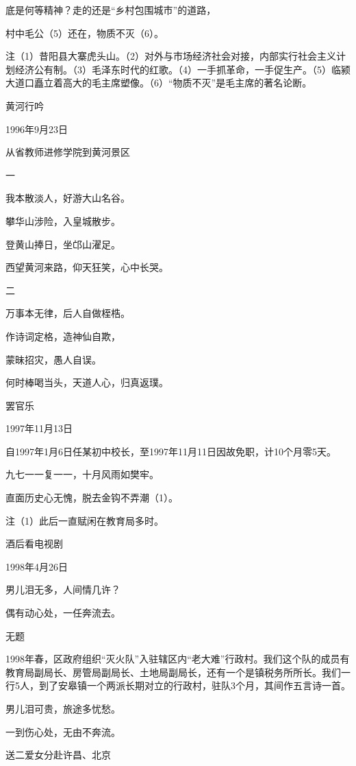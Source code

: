 \documentclass[../../dazhuan.tex]{subfiles}
\begin{document}
底是何等精神？走的还是“乡村包围城市”的道路，

村中毛公（5）还在，物质不灭（6）。

注（1）昔阳县大寨虎头山。（2）对外与市场经济社会对接，内部实行社会主义计划经济公有制。（3）毛泽东时代的红歌。（4）一手抓革命，一手促生产。（5）临颍大道口矗立着高大的毛主席塑像。（6）“物质不灭”是毛主席的著名论断。



黄河行吟

1996年9月23日

从省教师进修学院到黄河景区

一

我本散淡人，好游大山名谷。

攀华山涉险，入皇城散步。

登黄山捧日，坐邙山濯足。

西望黄河来路，仰天狂笑，心中长哭。

二

万事本无律，后人自做桎梏。

作诗词定格，造神仙自欺，

蒙昧招灾，愚人自误。

何时棒喝当头，天道人心，归真返璞。



罢官乐

1997年11月13日

自1997年1月6日任某初中校长，至1997年11月11日因故免职，计10个月零5天。

九七一一复一一，十月风雨如樊牢。

直面历史心无愧，脱去金钩不弄潮（1）。

注（1）此后一直赋闲在教育局多时。



酒后看电视剧

1998年4月26日

男儿泪无多，人间情几许？

偶有动心处，一任奔流去。



无题

1998年春，区政府组织“灭火队”入驻辖区内“老大难”行政村。我们这个队的成员有教育局副局长、房管局副局长、土地局副局长，还有一个是镇税务所所长。我们一行5人，到了安皋镇一个两派长期对立的行政村，驻队3个月，其间作五言诗一首。

男儿泪可贵，旅途多忧愁。

一到伤心处，无由不奔流。



送二爱女分赴许昌、北京
\end{document}
